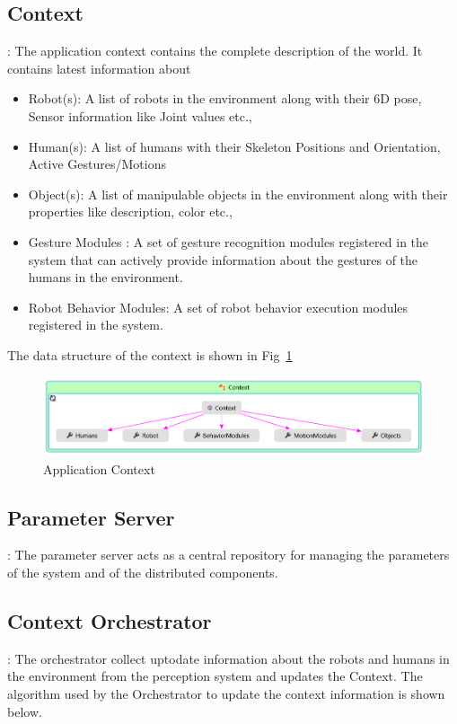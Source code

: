 \subsection{Context}: The application context contains the complete description of the world. It contains latest information about
\begin{itemize}
\item Robot(s): A list of robots in the environment along with their 6D pose, Sensor information like Joint values etc.,
\item Human(s): A list of humans with their Skeleton Positions and Orientation, Active Gestures/Motions
\item Object(s): A list of manipulable objects in the environment along with their properties like description, color etc.,
\item Gesture Modules : A set of gesture recognition modules registered in the system that can actively provide information about the gestures of the humans in the environment.
\item Robot Behavior Modules: A set of robot behavior execution modules registered in the system.
\end{itemize}
The data structure of the context is shown in Fig~\ref{fig:system_context}
\begin{figure}
\centering
\includegraphics[width=\textwidth]{assets/context_diagram.png}
\caption[Application Context]{Application Context}
\label{fig:system_context}
\end{figure}
\subsection{Parameter Server}: The parameter server acts as a central repository for managing the parameters of the system and of the distributed components.
\subsection{Context Orchestrator}: The orchestrator collect uptodate information about the robots and humans in the environment from the perception system and updates the Context. The algorithm used by the Orchestrator to update the context information is shown below.

